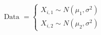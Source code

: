\documentclass[preview]{standalone}
\begin{document}
\begin{align*}
\text{Data } = \begin{cases}X_{i,1}\sim N(\mu_1,\sigma^2) \\X_{i,2}\sim N(\mu_2,\sigma^2)\end{cases}
\end{align*}
\end{document}
